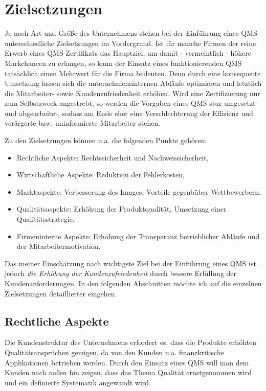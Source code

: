 \section{Zielsetzungen} \label{sec:ziele}
Je nach Art und Größe des Unternehmens stehen bei der Einführung eines QMS 
unterschiedliche Zielsetzungen im Vordergrund. Ist für manche Firmen der reine 
Erwerb eines QMS-Zertifikats das Hauptziel, um damit - vermeintlich - höhere 
Markchancen zu erlangen, so kann der Einsatz eines funktionierenden QMS 
tatsächlich einen Mehrwert für die Firma bedeuten. Denn durch eine konsequente 
Umsetzung lassen sich die unternehmensinternen Abläufe optimieren und letztlich 
die Mitarbeiter- sowie Kundenzufriedenheit erhöhen. Wird eine Zertifizierung 
nur zum Selbstzweck angestrebt, so werden die Vorgaben eines QMS stur umgesetzt 
und abgearbeitet, sodass am Ende eher eine Verschlechterung der Effizienz und 
verärgerte bzw. uninformierte Mitarbeiter stehen.

Zu den Zielsetzungen können u.a. die folgenden Punkte gehören:

\begin{itemize}
  \item Rechtliche Aspekte: Rechtssicherheit und Nachweissicherheit,
  \item Wirtschaftliche Aspekte: Reduktion der Fehlerkosten,
  \item Marktaspekte: Verbesserung des Images, Vorteile gegenbüber 
  Wettbewerbern,
  \item Qualitätsaspekte: Erhöhung der Produktqualität, Umsetzung einer 
  Qualitätsstrategie,
  \item Firmeninterne Aspekte: Erhöhung der Transperanz betrieblicher Abläufe
  und der Mitarbeitermotivation.
\end{itemize}

Das meiner Einschätzung nach wichtigste Ziel bei der Einführung eines QMS ist 
jedoch \emph{die Erhöhung der Kundenzufriedenheit} durch bessere Erfüllung der 
Kundenanforderungen. In den folgenden Abschnitten möchte ich auf die einzelnen
Zielsetzungen detaillierter eingehen.

\subsection{Rechtliche Aspekte}
Die Kundenstruktur des Unternehmens erfordert es, dass die Produkte erhöhten
Qualitätsansprüchen genügen, da von den Kunden u.a. finanzkritische
Applikationen betrieben werden. Durch den Einsatz eines QMS will man dem Kunden
nach außen hin zeigen, dass das Thema Qualität ernstgenommen wird und ein
definierte Systematik angewandt wird. 


